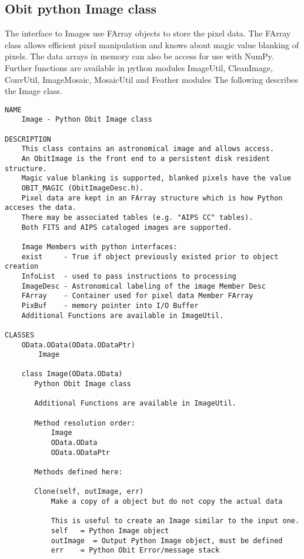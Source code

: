 \documentclass[11pt]{report}
\begin{document}
\subsection{Obit python Image class}
The interface to Images use FArray objects to store the pixel data.
The FArray class allows efficient pixel manipulation and knows about
magic value blanking of pixels.
The data arrays in memory can also be access for use with NumPy.
Further functions are available in python modules ImageUtil,
CleanImage, ConvUtil, ImageMosaic, MosaicUtil and Feather modules
The following describes the Image class.
\begin{verbatim}
NAME
    Image - Python Obit Image class

DESCRIPTION
    This class contains an astronomical image and allows access.
    An ObitImage is the front end to a persistent disk resident structure.
    Magic value blanking is supported, blanked pixels have the value
    OBIT_MAGIC (ObitImageDesc.h).
    Pixel data are kept in an FArray structure which is how Python acceses the data.
    There may be associated tables (e.g. "AIPS CC" tables).
    Both FITS and AIPS cataloged images are supported.
    
    Image Members with python interfaces:
    exist     - True if object previously existed prior to object creation
    InfoList  - used to pass instructions to processing
    ImageDesc - Astronomical labeling of the image Member Desc 
    FArray    - Container used for pixel data Member FArray
    PixBuf    - memory pointer into I/O Buffer
    Additional Functions are available in ImageUtil.

CLASSES
    OData.OData(OData.ODataPtr)
        Image
    
    class Image(OData.OData)
       Python Obit Image class
       
       Additional Functions are available in ImageUtil.
       
       Method resolution order:
           Image
           OData.OData
           OData.ODataPtr
       
       Methods defined here:
       
       Clone(self, outImage, err)
           Make a copy of a object but do not copy the actual data
           
           This is useful to create an Image similar to the input one.
           self   = Python Image object
           outImage  = Output Python Image object, must be defined
           err    = Python Obit Error/message stack
       

\end{verbatim}
\end{document}
